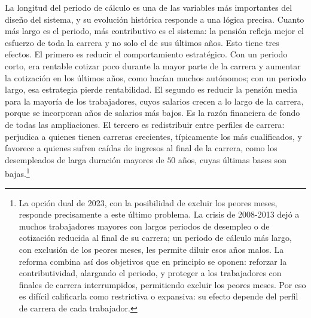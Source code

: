 \documentclass[10pt,a4paper]{article}
\begin{document}
La longitud del periodo de cálculo es una de las variables más importantes del diseño del sistema, y su evolución histórica responde a una lógica precisa. Cuanto más largo es el periodo, más contributivo es el sistema: la pensión refleja mejor el esfuerzo de toda la carrera y no solo el de sus últimos años. Esto tiene tres efectos. El primero es reducir el comportamiento estratégico. Con un periodo corto, era rentable cotizar poco durante la mayor parte de la carrera y aumentar la cotización en los últimos años, como hacían muchos autónomos; con un periodo largo, esa estrategia pierde rentabilidad. El segundo es reducir la pensión media para la mayoría de los trabajadores, cuyos salarios crecen a lo largo de la carrera, porque se incorporan años de salarios más bajos. Es la razón financiera de fondo de todas las ampliaciones. El tercero es redistribuir entre perfiles de carrera: perjudica a quienes tienen carreras crecientes, típicamente los más cualificados, y favorece a quienes sufren caídas de ingresos al final de la carrera, como los desempleados de larga duración mayores de $50$ años, cuyas últimas bases son bajas.\footnote{%
    La opción dual de 2023, con la posibilidad de excluir los peores meses, responde precisamente a este último problema. La crisis de 2008-2013 dejó a muchos trabajadores mayores con largos periodos de desempleo o de cotización reducida al final de su carrera; un periodo de cálculo más largo, con exclusión de los peores meses, les permite diluir esos años malos. La reforma combina así dos objetivos que en principio se oponen: reforzar la contributividad, alargando el periodo, y proteger a los trabajadores con finales de carrera interrumpidos, permitiendo excluir los peores meses. Por eso es difícil calificarla como restrictiva o expansiva: su efecto depende del perfil de carrera de cada trabajador.
}
\end{document}
